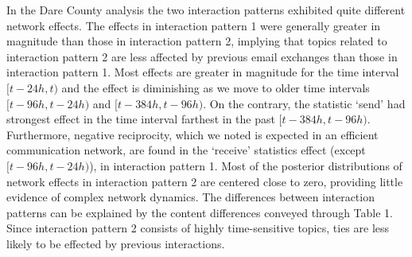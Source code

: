 \documentclass[a4paper]{article}
\begin{document}
In the Dare County analysis the two interaction patterns exhibited quite different network effects. The effects in interaction pattern 1 were generally greater in magnitude than those in interaction pattern 2, implying that topics related to interaction pattern 2 are less affected by previous email exchanges than those in interaction pattern 1. Most effects are greater in magnitude for the time interval $[t-24h, t)$ and the effect is diminishing as we move to older time intervals $[t-96h, t-24h)$ and $[t-384h, t-96h)$. On the contrary, the statistic `send' had strongest effect in the time interval farthest in the past $[t-384h, t-96h)$. Furthermore, negative reciprocity, which we noted is expected in an efficient communication network, are found in the `receive' statistics effect (except $[t-96h, t-24h)$), in interaction pattern 1.  Most of the posterior distributions of network effects in interaction pattern 2 are centered close to zero, providing little evidence of complex network dynamics. The differences between interaction patterns can be explained by the content differences conveyed through Table 1. Since interaction pattern 2 consists of highly time-sensitive topics, ties are less likely to be effected by previous interactions.
\end{document}
